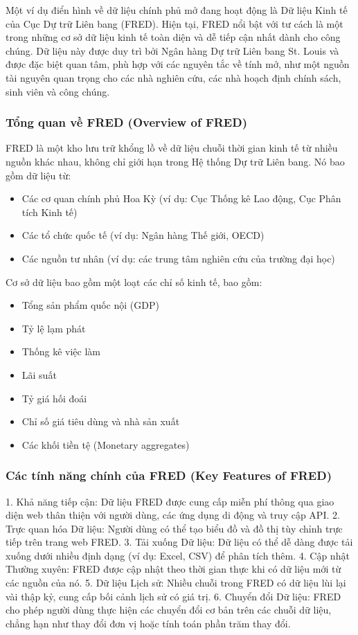 Một ví dụ điển hình về dữ liệu chính phủ mở đang hoạt động là Dữ liệu Kinh tế của Cục Dự trữ Liên bang (FRED). Hiện tại, FRED nổi bật với tư cách là một trong những cơ sở dữ liệu kinh tế toàn diện và dễ tiếp cận nhất dành cho công chúng. Dữ liệu này được duy trì bởi Ngân hàng Dự trữ Liên bang St. Louis và được đặc biệt quan tâm, phù hợp với các nguyên tắc về tính mở, như một nguồn tài nguyên quan trọng cho các nhà nghiên cứu, các nhà hoạch định chính sách, sinh viên và công chúng.

\subsubsection[Tổng quan về FRED]{Tổng quan về FRED (Overview of FRED)}

FRED là một kho lưu trữ khổng lồ về dữ liệu chuỗi thời gian kinh tế từ nhiều nguồn khác nhau, không chỉ giới hạn trong Hệ thống Dự trữ Liên bang. Nó bao gồm dữ liệu từ:
\begin{itemize}
    \item Các cơ quan chính phủ Hoa Kỳ (ví dụ: Cục Thống kê Lao động, Cục Phân tích Kinh tế)
    \item Các tổ chức quốc tế (ví dụ: Ngân hàng Thế giới, OECD)
    \item Các nguồn tư nhân (ví dụ: các trung tâm nghiên cứu của trường đại học)
\end{itemize}

Cơ sở dữ liệu bao gồm một loạt các chỉ số kinh tế, bao gồm:
\begin{itemize}
    \item Tổng sản phẩm quốc nội (GDP)
    \item Tỷ lệ lạm phát
    \item Thống kê việc làm
    \item Lãi suất
    \item Tỷ giá hối đoái
    \item Chỉ số giá tiêu dùng và nhà sản xuất
    \item Các khối tiền tệ (Monetary aggregates)
\end{itemize}

\subsubsection[Các tính năng chính của FRED]{Các tính năng chính của FRED (Key Features of FRED)}

1. Khả năng tiếp cận: Dữ liệu FRED được cung cấp miễn phí thông qua giao diện web thân thiện với người dùng, các ứng dụng di động và truy cập API.
2. Trực quan hóa Dữ liệu: Người dùng có thể tạo biểu đồ và đồ thị tùy chỉnh trực tiếp trên trang web FRED.
3. Tải xuống Dữ liệu: Dữ liệu có thể dễ dàng được tải xuống dưới nhiều định dạng (ví dụ: Excel, CSV) để phân tích thêm.
4. Cập nhật Thường xuyên: FRED được cập nhật theo thời gian thực khi có dữ liệu mới từ các nguồn của nó.
5. Dữ liệu Lịch sử: Nhiều chuỗi trong FRED có dữ liệu lùi lại vài thập kỷ, cung cấp bối cảnh lịch sử có giá trị.
6. Chuyển đổi Dữ liệu: FRED cho phép người dùng thực hiện các chuyển đổi cơ bản trên các chuỗi dữ liệu, chẳng hạn như thay đổi đơn vị hoặc tính toán phần trăm thay đổi.

